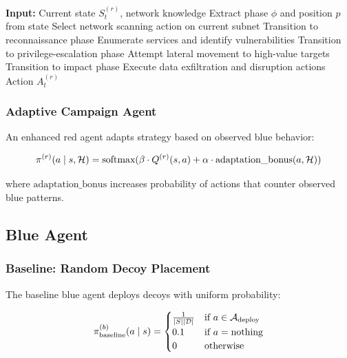 \documentclass[12pt,twoside]{article}
\begin{document}
\begin{algorithm}
\caption{Deterministic Red Agent Policy}
\begin{algorithmic}[1]
\STATE \textbf{Input:} Current state $S_t^{(r)}$, network knowledge
\STATE Extract phase $\phi$ and position $p$ from state
    \STATE Select network scanning action on current subnet
        \STATE Transition to reconnaissance phase
    \ENDIF
{}
    \STATE Enumerate services and identify vulnerabilities
        \STATE Transition to privilege-escalation phase
    \ENDIF
{}
    \STATE Attempt lateral movement to high-value targets
        \STATE Transition to impact phase
    \ENDIF
{}
    \STATE Execute data exfiltration and disruption actions
\ENDIF
\RETURN Action $A_t^{(r)}$
\end{algorithmic}
\end{algorithm}

\subsubsection{Adaptive Campaign Agent}
An enhanced red agent adapts strategy based on observed blue behavior:

\begin{equation}
\pi^{(r)}(a \mid s, \mathcal{H}) = \text{softmax}(\beta \cdot Q^{(r)}(s, a) + \alpha \cdot \text{adaptation\_bonus}(a, \mathcal{H}))
\end{equation}

where $\text{adaptation\_bonus}$ increases probability of actions that counter observed blue patterns.

\subsection{Blue Agent}

\subsubsection{Baseline: Random Decoy Placement}
The baseline blue agent deploys decoys with uniform probability:

\begin{equation}
\pi^{(b)}_{\text{baseline}}(a \mid s) = \begin{cases}
\frac{1}{|S||\mathcal{D}|} & \text{if } a \in \mathcal{A}_{\text{deploy}} \\
0.1 & \text{if } a = \text{nothing} \\
0 & \text{otherwise}
\end{cases}
\end{equation}
\end{document}
